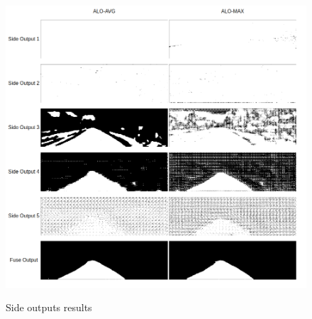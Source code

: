 \begin{figure}
  \caption{Side outputs results}
  \centering
  \includegraphics[width=1.\columnwidth]{figures/falreis/side_outputs.png}
  \label{fig:side_outputs}
\end{figure}



